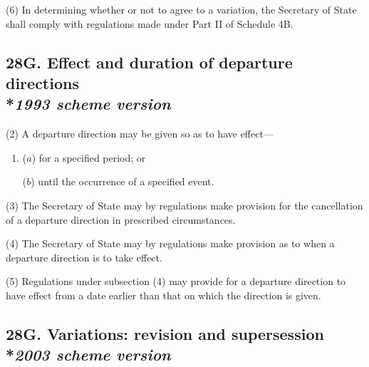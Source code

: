 \documentclass[12pt,a4paper]{article}
\begin{document}
(6) In determining whether or not to agree to a variation, the Secretary of State shall comply with regulations made under Part II of Schedule 4B.


\subsection[28G. Effect and duration of departure directions --- \emph{1993 scheme version}]{28G. Effect and duration of departure directions\\*\emph{1993 scheme version}}


(2) A departure direction may be given so as to have effect—
\begin{enumerate}\item[]
($a$) for a specified period; or

($b$) until the occurrence of a specified event.
\end{enumerate}

(3) The Secretary of State may by regulations make provision for the cancellation of a departure direction in prescribed circumstances.

(4) The Secretary of State may by regulations make provision as to when a departure direction is to take effect.

(5) Regulations under subsection (4) may provide for a departure direction to have effect from a date earlier than that on which the direction is given.


\subsection[28G. Variations: revision and supersession --- \emph{2003 scheme version}]{28G. Variations: revision and supersession\\*\emph{2003 scheme version}}
\end{document}
